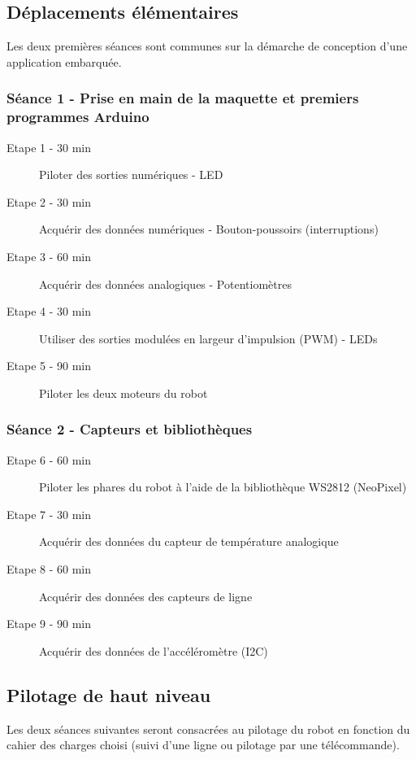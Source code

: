 \documentclass[a4paper,11pt,titlepage]{article} %
\begin{document}
\subsection{Déplacements élémentaires}

Les deux premières séances sont communes sur la démarche de conception d'une application embarquée.


\subsubsection{Séance 1 - Prise en main de la maquette et premiers programmes Arduino}
\begin{description}
	\item[Etape 1 - 30 min] Piloter des sorties numériques - LED
	\item[Etape 2 - 30 min] Acquérir des données numériques - Bouton-poussoirs (interruptions)
	\item[Etape 3 - 60 min] Acquérir des données analogiques - Potentiomètres
	\item[Etape 4 - 30 min] Utiliser des sorties modulées en largeur d'impulsion (PWM) - LEDs
	\item[Etape 5 - 90 min] Piloter les deux moteurs du robot
\end{description}
	
	\bigskip

\subsubsection{Séance 2 - Capteurs et bibliothèques}
\begin{description}
	\item[Etape 6 - 60 min] Piloter les phares du robot à l'aide de la bibliothèque WS2812 (NeoPixel)
	\item[Etape 7 - 30 min] Acquérir des données du capteur de température analogique
	\item[Etape 8 - 60 min] Acquérir des données des capteurs de ligne
	\item[Etape 9 - 90 min] Acquérir des données de l'accéléromètre (I2C)
\end{description}



\subsection{Pilotage de haut niveau}

Les deux séances suivantes seront consacrées au pilotage du robot en fonction du cahier des charges choisi (suivi d'une ligne ou pilotage par une télécommande).
\end{document}
